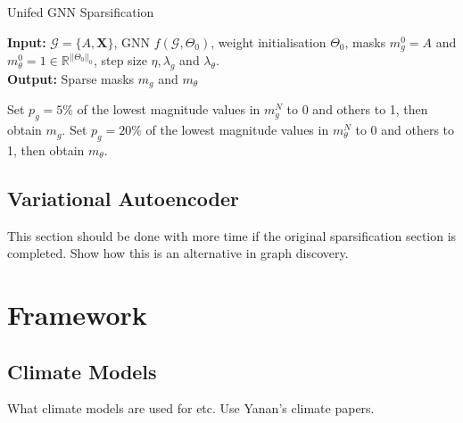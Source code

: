 \documentclass[honours,12pt]{unswthesis}
\newcommand{\R}{\mathbb{R}}
\numberwithin{equation}{section}
\begin{document}
\begin{algorithm}
    \caption{Unifed GNN Sparsification\cite{chen2021unified}}\label{alg:ugs}
    \textbf{Input:}  $\mathcal{G} = \{A, \textbf{X}\}$, GNN $f(\mathcal{G}, \Theta_0)$, weight initialisation $\Theta_0$, masks $m^0_g = A$ and $m^0_\theta = 1 \in \R^{||\Theta_0||_0}$, step size $\eta, \lambda_g$ and $\lambda_\theta$.\\
    \textbf{Output:} Sparse masks $m_g$ and $m_\theta$
    \begin{algorithmic}[1]
        \EndFor
        \State Set $p_g = 5\%$ of the lowest magnitude values in $m_g^N$ to 0 and others to 1, then obtain $m_g$.
        \State Set $p_g = 20\%$ of the lowest magnitude values in $m_\theta^N$ to 0 and others to 1, then obtain $m_\theta$.
    \end{algorithmic}
\end{algorithm}

\section{Variational Autoencoder}\label{vgae}
This section should be done with more time if the original sparsification section is completed.
Show how this is an alternative in graph discovery.




\chapter{Framework}\label{framework}



\section{Climate Models}\label{climate}
What climate models are used for etc.
Use Yanan's climate papers.
\end{document}
